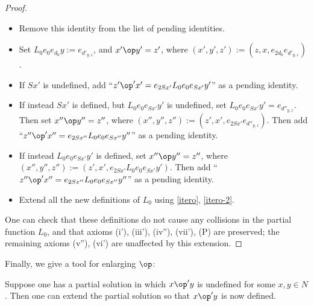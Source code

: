\begin{proof}
\begin{itemize}
\item Remove this identity from the list of pending identities.
\item Set $L_0 e_0 e_{d_0} y := e_{d'_{y,z}}$, and $x' \op y' = z'$, where $(x',y',z') := (z, x, e_{2d_0} e_{d'_{y,z}})$.
\item If $Sx'$ is undefined, add ``$z' \op' x' = e_{2Sx'} L_0 e_0 e_{Sx'} y'$'' as a pending identity.
\item If instead $Sx'$ is defined, but $L_0 e_0 e_{Sx'} y'$ is undefined, set $L_0 e_0 e_{Sx'} y' = e_{d''_{y,z}}$.  Then set $x'' \op y'' = z''$, where $(x'',y'',z'') := (z', x', e_{2Sx'} e_{d''_{y,z}})$.  Then add ``$z'' \op' x'' = e_{2Sx''} L_0 e_0 e_{Sx''} y''$'' as a pending identity.
\item If instead $L_0 e_0 e_{Sx'} y'$ is defined, set $x'' \op y'' = z''$, where $(x'',y'',z'') := (z', x', e_{2Sx'} L_0 e_0 e_{Sx'} y')$.  Then add ``$z'' \op' x'' = e_{2Sx''} L_0 e_0 e_{Sx''} y''$'' as a pending identity.
\item Extend all the new definitions of $L_0$ using \eqref{itero}, \eqref{itero-2}.
\end{itemize}
One can check that these definitions do not cause any collisions in the partial function $L_0$, and that axioms (i'), (iii'), (iv''), (vii'), (P) are preserved; the remaining axioms (v''), (vi') are unaffected by this extension.
\end{proof}

Finally, we give a tool for enlarging $\op$:

\begin{proposition}[Enlarging $\op$]\label{enlarge-op}  Suppose one has a partial solution in which $x \op' y$ is undefined for some $x,y \in N$.  Then one can extend the partial solution so that $x \op' y$ is now defined.
\end{proposition}


